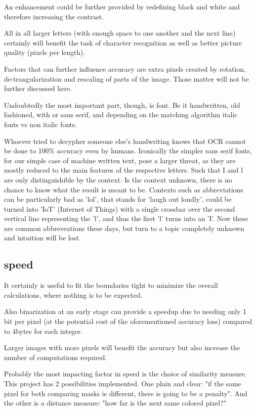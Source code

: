 \documentclass[12pt]{scrartcl}
\begin{document}
An enhancement could be further provided by redefining black and white and therefore increasing the contrast.

All in all larger letters (with enough space to one another and the next line) certainly will benefit the task of character recognition as well as better picture quality (pixels per length).

Factors that can further influence accuracy are extra pixels created by rotation, de-trangularization and rescaling of parts of the image. Those matter will not be further discussed here.

Undoubtedly the most important part, though, is font. Be it handwritten, old fashioned, with or sans serif, and depending on the matching algorithm italic fonts vs non italic fonts.

Whoever tried to decypher someone else's handwriting knows that OCR cannot be done to 100\% accuracy even by humans. Ironically the simpler sans serif fonts, for our simple case of machine written text, pose a larger threat, as they are mostly reduced to the main features of the respective letters. Such that I and l are only distinguishible by the context. Is the context unknown, there is no chance to know what the result is meant to be. Contexts such as abbreviations can be particularly bad as 'lol', that stands for 'laugh out loudly', could be turned into 'IoT' (Internet of Things) with a single crossbar over the second vertical line representing the 'l', and thus the first 'l' turns into an 'I'. Now these are common abbreveations these days, but turn to a topic completely unknown and intuition will be lost.


\subsection {speed}
It certainly is useful to fit the boundaries tight to minimize the overall calculations, where nothing is to be expected.

Also binarization at an early stage can provide a speedup due to needing only 1 bit per pixel (at the potential cost of the aforementioned accuracy loss) compared to 4bytes for each integer.

Larger images with more pixels will benefit the accuracy but also increase the number of computations required.

Probably the most impacting factor in speed is the choice of similarity measure. This project has 2 possibilities implemented. One plain and clear: "if the same pixel for both comparing masks is different, there is going to be a penalty". And the other is a distance measure: "how far is the next same colored pixel?"
\end{document}
